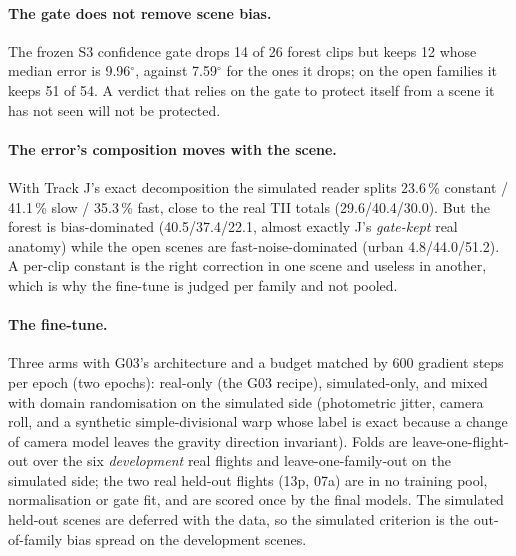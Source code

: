 \paragraph{The gate does not remove scene bias.} The frozen S3 confidence gate drops 14 of 26
forest clips but keeps 12 whose median error is 9.96$^\circ$, against 7.59$^\circ$ for the ones
it drops; on the open families it keeps 51 of 54. A verdict that relies on the gate to protect
itself from a scene it has not seen will not be protected.

\paragraph{The error's composition moves with the scene.} With Track J's exact decomposition the
simulated reader splits 23.6\,\% constant / 41.1\,\% slow / 35.3\,\% fast, close to the real TII
totals (29.6/40.4/30.0). But the forest is bias-dominated (40.5/37.4/22.1, almost exactly J's
\emph{gate-kept} real anatomy) while the open scenes are fast-noise-dominated (urban
4.8/44.0/51.2). A per-clip constant is the right correction in one scene and useless in another,
which is why the fine-tune is judged per family and not pooled.

\paragraph{The fine-tune.} Three arms with G03's architecture and a budget matched by 600 gradient
steps per epoch (two epochs): real-only (the G03 recipe), simulated-only, and mixed with domain
randomisation on the simulated side (photometric jitter, camera roll, and a synthetic
simple-divisional warp whose label is exact because a change of camera model leaves the gravity
direction invariant). Folds are leave-one-flight-out over the six \emph{development} real flights
and leave-one-family-out on the simulated side; the two real held-out flights (13p, 07a) are in no
training pool, normalisation or gate fit, and are scored once by the final models. The simulated
held-out scenes are deferred with the data, so the simulated criterion is the out-of-family bias
spread on the development scenes.

\newcommand{\LTwoRealA}{7.51}
\newcommand{\LTwoRealB}{19.87}
\newcommand{\LTwoRealC}{20.44}
\newcommand{\LTwoSpreadA}{1.05}
\newcommand{\LTwoSpreadB}{0.63}
\newcommand{\LTwoSpreadC}{0.63}
\newcommand{\LTwoDownA}{7/72}
\newcommand{\LTwoDownB}{6/72}
\newcommand{\LTwoDownC}{6/72}

